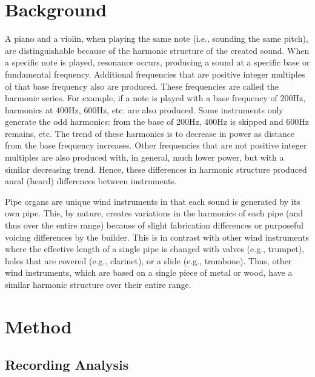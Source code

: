\documentclass[twocolumn]{article}
\begin{document}
\section{Background}

A piano and a violin, when playing the same note (i.e., sounding the same pitch), are distinguishable because of the harmonic structure of the created sound. When a specific note is played, resonance occurs, producing a sound at a specific base or fundamental frequency. Additional frequencies that are positive integer multiples of that base frequency also are produced. These frequencies are called the harmonic series. For example, if a note is played with a base frequency of 200Hz, harmonics at 400Hz, 600Hz, etc. are also produced. Some instruments only generate the odd harmonics: from the base of 200Hz, 400Hz is skipped and 600Hz remains, etc. The trend of these harmonics is to decrease in power as distance from the base frequency increases. Other frequencies that are not positive integer multiples are also produced with, in general, much lower power, but with a similar decreasing trend. Hence, these differences in harmonic structure produced aural (heard) differences between instruments.

Pipe organs are unique wind instruments in that each sound is generated by its own pipe. This, by nature, creates variations in the harmonics of each pipe (and thus over the entire range) because of slight fabrication differences or purposeful voicing differences by the builder. This is in contrast with other wind instruments where the effective length of a single pipe is changed with valves (e.g., trumpet), holes that are covered (e.g., clarinet), or a slide (e.g., trombone). Thus, other wind instruments, which are based on a single piece of metal or wood, have a similar harmonic structure over their entire range.

\section{Method}

\subsection{Recording Analysis}
\end{document}
